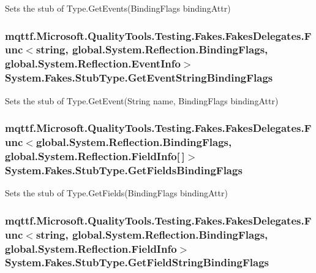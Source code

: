 Sets the stub of Type.\-Get\-Events(\-Binding\-Flags binding\-Attr)

\hypertarget{class_system_1_1_fakes_1_1_stub_type_abf98cbf3d5c29000dda1b6edb2194f01}{
\subsubsection[{Get\-Event\-String\-Binding\-Flags}]{\setlength{\rightskip}{0pt plus 5cm}mqttf.\-Microsoft.\-Quality\-Tools.\-Testing.\-Fakes.\-Fakes\-Delegates.\-Func$<$string, global.\-System.\-Reflection.\-Binding\-Flags, global.\-System.\-Reflection.\-Event\-Info$>$ System.\-Fakes.\-Stub\-Type.\-Get\-Event\-String\-Binding\-Flags}}\label{class_system_1_1_fakes_1_1_stub_type_abf98cbf3d5c29000dda1b6edb2194f01}


Sets the stub of Type.\-Get\-Event(\-String name, Binding\-Flags binding\-Attr)

\hypertarget{class_system_1_1_fakes_1_1_stub_type_a1f91fb7d9ff429abb8b090470cd75a81}{
\subsubsection[{Get\-Fields\-Binding\-Flags}]{\setlength{\rightskip}{0pt plus 5cm}mqttf.\-Microsoft.\-Quality\-Tools.\-Testing.\-Fakes.\-Fakes\-Delegates.\-Func$<$global.\-System.\-Reflection.\-Binding\-Flags, global.\-System.\-Reflection.\-Field\-Info\mbox{[}$\,$\mbox{]}$>$ System.\-Fakes.\-Stub\-Type.\-Get\-Fields\-Binding\-Flags}}\label{class_system_1_1_fakes_1_1_stub_type_a1f91fb7d9ff429abb8b090470cd75a81}


Sets the stub of Type.\-Get\-Fields(\-Binding\-Flags binding\-Attr)

\hypertarget{class_system_1_1_fakes_1_1_stub_type_ad343ddd42f49f5d8258372720529cfce}{
\subsubsection[{Get\-Field\-String\-Binding\-Flags}]{\setlength{\rightskip}{0pt plus 5cm}mqttf.\-Microsoft.\-Quality\-Tools.\-Testing.\-Fakes.\-Fakes\-Delegates.\-Func$<$string, global.\-System.\-Reflection.\-Binding\-Flags, global.\-System.\-Reflection.\-Field\-Info$>$ System.\-Fakes.\-Stub\-Type.\-Get\-Field\-String\-Binding\-Flags}}\label{class_system_1_1_fakes_1_1_stub_type_ad343ddd42f49f5d8258372720529cfce}


